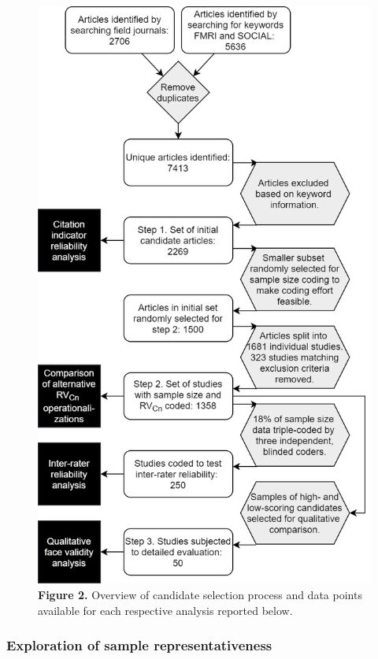 \documentclass[
  english,
  man,floatsintext]{apa6}
\begin{document}
\begin{figure}
\centering
\includegraphics{sample_selection_process.png}
\caption{\textbf{Figure 2.} Overview of candidate selection process and data points available for each respective analysis reported below.}
\end{figure}

\hypertarget{exploration-of-sample-representativeness}{%
\subsubsection{Exploration of sample representativeness}\label{exploration-of-sample-representativeness}}
\end{document}
